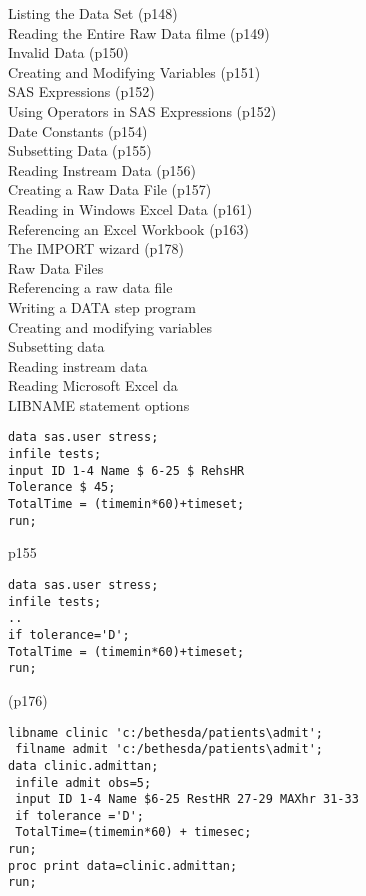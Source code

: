 Listing the Data Set (p148)\\
Reading the Entire Raw Data filme (p149)\\
Invalid Data (p150)\\
Creating and Modifying Variables (p151)\\
SAS Expressions (p152)\\
Using Operators in SAS Expressions (p152)\\
Date Constants (p154)\\
Subsetting Data (p155)\\
Reading Instream Data (p156)\\
Creating a Raw Data File (p157)\\
Reading in Windows Excel Data (p161)\\
Referencing an Excel Workbook (p163)\\
The IMPORT wizard (p178)\\
Raw Data Files\\
Referencing a raw data file\\
Writing a DATA step program\\
Creating and modifying variables\\
Subsetting data\\
Reading instream data\\
Reading Microsoft Excel da\\
LIBNAME statement options\\

\begin{framed}
\begin{verbatim}
data sas.user stress;
infile tests;
input ID 1-4 Name $ 6-25 $ RehsHR
Tolerance $ 45;
TotalTime = (timemin*60)+timeset;
run;
\end{verbatim}
\end{framed}


p155



\begin{framed}
\begin{verbatim}
data sas.user stress;
infile tests;
..
if tolerance='D';
TotalTime = (timemin*60)+timeset;
run;
\end{verbatim}
\end{framed}



(p176)
\begin{framed}
\begin{verbatim}
libname clinic 'c:/bethesda/patients\admit';
 filname admit 'c:/bethesda/patients\admit';
data clinic.admittan;
 infile admit obs=5;
 input ID 1-4 Name $6-25 RestHR 27-29 MAXhr 31-33
 if tolerance ='D';
 TotalTime=(timemin*60) + timesec;
run;
proc print data=clinic.admittan;
run;
\end{verbatim}
\end{framed}




